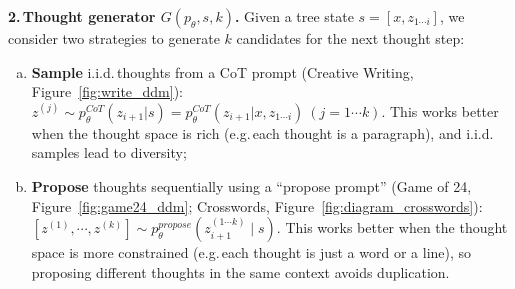 \documentclass{article}
\begin{document}
\textbf{2.\,Thought generator $G(p_\theta, s, k)$.} Given a tree state $s = [x, z_{1\cdots i}]$, we consider two strategies to generate $k$ candidates for the next thought step: 
\begin{enumerate}[(a)]
\vspace{-6pt}
\item 
\textbf{Sample} i.i.d.\,thoughts from a CoT prompt (Creative Writing, Figure~\ref{fig:write_ddm}): $z^{(j)} \sim p_\theta^{CoT}(z_{i+1} | s) = p_\theta^{CoT}(z_{i+1} | x, z_{1\cdots i}) \ (j=1 \cdots k)$. This works better when the thought space is rich (e.g.\,each thought is a paragraph), and i.i.d.\,samples lead to diversity; 
\item
\textbf{Propose} thoughts sequentially using a ``propose prompt'' (Game of 24, Figure~\ref{fig:game24_ddm}; Crosswords, Figure~\ref{fig:diagram_crosswords}): $[z^{(1)}, \cdots, z^{(k)}] \sim p_\theta^{propose}(z_{i+1}^{(1 \cdots k)} \mid s)$. This works better when the thought space is more constrained (e.g.\,each thought is just a word or a line), so proposing different thoughts in the same context avoids duplication. 
\vspace{-6pt}
\end{enumerate}
\end{document}
